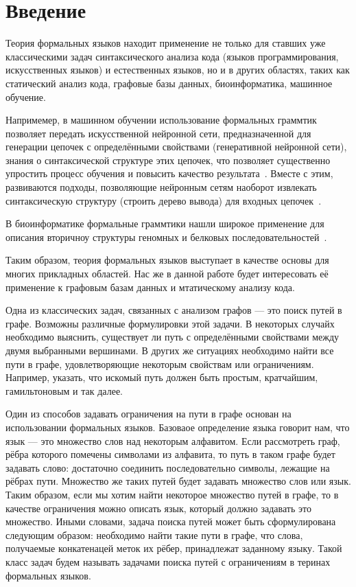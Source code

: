 \chapter*{Введение}

Теория формальных языков находит применение не только для ставших уже классическими задач синтаксического анализа кода (языков программирования, искусственных языков) и естественных языков, но и в других областях, таких как статический анализ кода, графовые базы данных, биоинформатика, машинное обучение.

Напримемер, в машинном обучении использование формальных граммтик позволяет передать искусственной нейронной сети, предназначенной для генерации цепочек с определёнными свойствами (генеративной нейронной сети), знания о синтаксической структуре этих цепочек, что позволяет существенно упростить процесс обучения и повысить качество результата~\cite{!!!}. Вместе с этим, развиваются подходы, позволяющие нейронным сетям наоборот извлекать синтаксическую структуру (строить дерево вывода) для входных цепочек~\cite{!!!}.

В биоинформатике формальные граммтики нашли широкое применение для описания вторичноу структуры геномных и белковых последовательностей~\cite{!!!}.



Таким образом, теория формальных языков выступает в качестве основы для многих прикладных областей. Нас же в данной работе будет интересовать её применение к графовым базам данных и мтатическому анализу кода. 


Одна из классических задач, связанных с анализом графов --- это поиск путей в графе.
Возможны различные формулировки этой задачи.
В некоторых случайх необходимо выяснить, существует ли путь с определёнными свойствами между двумя выбранными вершинами.
В других же ситуациях необходимо найти все пути в графе, удовлетворяющие некоторым свойствам или ограничениям. 
Например, указать, что искомый путь должен быть простым, кратчайшим, гамильтоновым и так далее.

Один из способов задавать ограничения на пути в графе основан на использовании формальных языков.
Базоваое определение языка говорит нам, что язык --- это множество слов над некоторым алфавитом.
Если рассмотреть граф, рёбра которого помечены символами из алфавита, то путь в таком графе будет задавать слово: достаточно соединить последовательно символы, лежащие на рёбрах пути.
Множество же таких путей будет задавать множество слов или язык.
Таким образом, если мы хотим найти некоторое множество путей в графе, то в качестве ограничения можно описать язык, который должно задавать это множество.
Иными словами, задача поиска путей может быть сформулирована следующим образом: необходимо найти такие пути в графе, что слова, получаемые конкатенацей меток их рёбер, принадлежат заданному языку.
Такой класс задач будем называть задачами поиска путей с ограничениям в теринах формальных языков.

